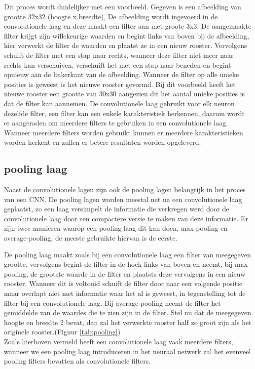 Dit proces wordt duidelijker met een voorbeeld.
Gegeven is een afbeelding van grootte 32x32 (hoogte x breedte),
De afbeelding wordt ingevoerd in de convolutionele laag en deze maakt een filter aan met groote 3x3.
De aangemaakte filter krijgt zijn willekeurige waarden en begint links van boven bij de afbeelding, hier verwerkt de filter de waarden en plaatst ze in een nieuw rooster. 
Vervolgens schuift de filter met een stap naar rechts, wanneer deze filter niet meer naar rechts kan verschuiven, verschuift het met een stap naar beneden en begint opnieuw aan de linkerkant van de afbeelding.
Wanneer de filter op alle unieke posities is geweest is het nieuwe rooster gevormd. Bij dit voorbeeld heeft het nieuwe rooster een grootte van 30x30 aangezien dit het aantal unieke posities is dat de filter kan aannemen.
De convolutionele laag gebruikt voor elk neuron dezelfde filter, een filter kan een enkele karakteristiek herkennen, daarom wordt er aangeraden om meerdere filters te gebruiken in een convolutionele laag.
Wanneer meerdere filters worden gebruikt kunnen er meerdere karakteristieken worden herkent en zullen er betere resultaten worden opgeleverd.



\subsection{pooling laag}

Naast de convolutionele lagen zijn ook de pooling lagen belangrijk in het proces van een CNN.
De pooling lagen worden meestal net na een convolutionele laag geplaatst, zo een laag versimpelt de informatie die verkregen werd door de convolutionele laag door een compactere versie te maken van deze informatie.
Er zijn twee manieren waarop een pooling laag dit kan doen, max-pooling en average-pooling, de meeste gebruikte hiervan is de eerste.

De pooling laag maakt zoals bij een convolutionele laag een filter van meegegeven grootte, vervolgens begint de filter in de hoek links van boven en neemt, bij max-pooling, de grootste waarde in de filter en plaatsts deze vervolgens in een nieuw rooster. Wanneer dit is voltooid schuift de filter door naar een volgende positie maar overlapt niet met informatie waar het al is geweest, in tegenstelling tot de filter bij een convolutionele laag.
Bij average-pooling neemt de filter het gemiddelde van de waardes die te zien zijn in de filter.
Stel nu dat de meegegeven hoogte en breedte 2 bevat, dan zal het verwerkte rooster half zo groot zijn als het originele rooster.(Figuur \ref{tab:pooling})\\
Zoals hierboven vermeld heeft een convolutionele laag vaak meerdere filters, wanneer we een pooling laag introduceren in het neuraal netwerk zal het evenveel pooling filters bevatten als convolutionele filters.

